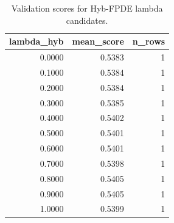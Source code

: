 \begin{table}[t]
\caption{Validation scores for Hyb-FPDE lambda candidates.}
\label{tab:lambda_distribution_computed}
\centering
\begin{tabular}{rrr}
\toprule
lambda\_hyb & mean\_score & n\_rows \\
\midrule
0.0000 & 0.5383 & 1 \\
0.1000 & 0.5384 & 1 \\
0.2000 & 0.5384 & 1 \\
0.3000 & 0.5385 & 1 \\
0.4000 & 0.5402 & 1 \\
0.5000 & 0.5401 & 1 \\
0.6000 & 0.5401 & 1 \\
0.7000 & 0.5398 & 1 \\
0.8000 & 0.5405 & 1 \\
0.9000 & 0.5405 & 1 \\
1.0000 & 0.5399 & 1 \\
\bottomrule
\end{tabular}

\end{table}

